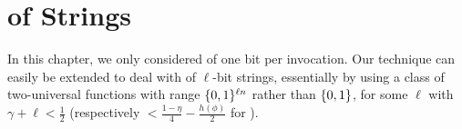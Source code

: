 \section{\RabinOT of Strings} \label{sec:extensionrot}
In this chapter, we only considered \RabinOT of one bit per invocation.
Our technique can easily be extended to deal with \RabinlStringOT of
$\ell$-bit strings, essentially by using a class of two-universal
functions  with range $\{0,1\}^{\ell
  n}$ rather than $\{0,1\}$, for some $\ell$ with $\gamma + \ell <
\frac{1}{2}$ (respectively $<\frac{1-\eta}{4}-\frac{h(\phi)}{2}$ for
\BBqot).




